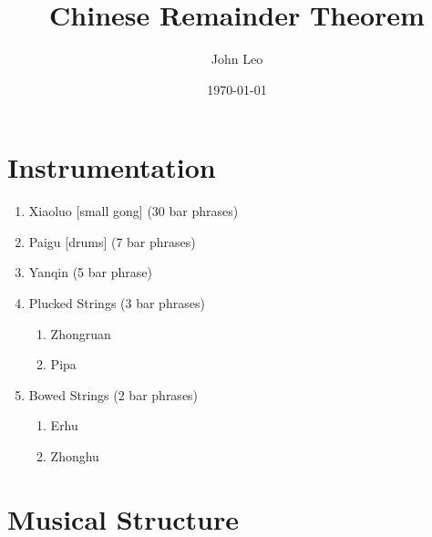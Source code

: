 \documentclass[12pt]{article}
\title{Chinese Remainder Theorem}
\author{John Leo}
\date{\today}
\begin{document}
\maketitle

\section{Instrumentation}

\begin{enumerate}
\item Xiaoluo [small gong] (30 bar phrases)
\item Paigu [drums] (7 bar phrases)
\item Yanqin (5 bar phrase)
\item Plucked Strings (3 bar phrases)
  \begin{enumerate}
  \item Zhongruan
  \item Pipa
  \end{enumerate}
\item Bowed Strings (2 bar phrases)
  \begin{enumerate}
  \item Erhu
  \item Zhonghu
  \end{enumerate}
\end{enumerate}

\section{Musical Structure}
\end{document}
